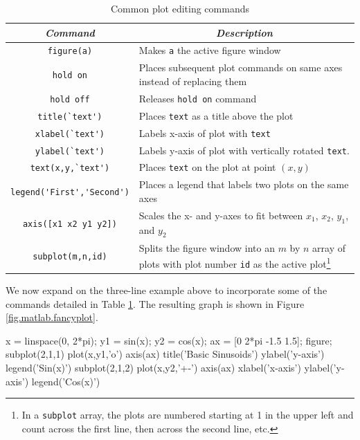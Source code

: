 \begin{table}[hbp!]
\begin{minipage}{\textwidth}
\centering
\renewcommand{\arraystretch}{1.3}
\begin{tabular}{c|p{}}
    \textit{Command}& \multicolumn{1}{c}{\textit{Description}}\\ \hline \hline
    \verb=figure(a)=    &   Makes \verb=a= the active figure window\\
    \verb=hold on=      &   Places subsequent plot commands on same axes instead of replacing them \\
    \verb=hold off=     &   Releases \verb=hold on= command\\
    \verb=title(`text')=&   Places \verb=text= as a title above the plot\\
    \verb=xlabel(`text')=&  Labels x-axis of plot with \verb=text=\\
    \verb=ylabel(`text')=&  Labels y-axis of plot with vertically rotated
                                \verb=text=.\\
    \verb=text(x,y,`text')=& Places \verb=text= on the plot at point $(x,y)$\\
    \verb=legend('First','Second')= & Places a legend that labels two plots on the same axes\\
    \verb=axis([x1 x2 y1 y2])=      & Scales the x- and y-axes to fit between $x_1$, $x_2$, $y_1$, and $y_2$\\
    \verb=subplot(m,n,id)=& Splits the figure window into an $m$ by $n$ array of plots with plot number \verb=id= as the active plot\footnote{In a \texttt{subplot} array, the plots are numbered starting at 1 in the upper left and count across the first line, then across the second line, etc.}
    \end{tabular}
\caption{\footnotesize
        Common plot editing commands
        \label{tab.plotting}
        }
\end{minipage}
\end{table}

We now expand on the three-line example above to incorporate some of the commands detailed in Table \ref{tab.plotting}.  The resulting graph is shown in Figure \ref{fig.matlab.fancyplot}.

\begin{codex}
x = linspace(0, 2*pi);
y1 = sin(x);
y2 = cos(x);
ax = [0 2*pi -1.5 1.5];
figure;
subplot(2,1,1)
plot(x,y1,'o')
axis(ax)
title('Basic Sinusoids')
ylabel('y-axis')
legend('Sin(x)')
subplot(2,1,2)
plot(x,y2,'+-')
axis(ax)
xlabel('x-axis')
ylabel('y-axis')
legend('Cos(x)')
\end{codex}

